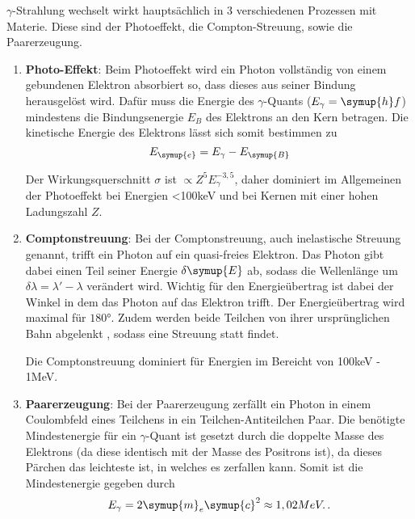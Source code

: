 \noindent
$\gamma$-Strahlung wechselt wirkt hauptsächlich in 3 verschiedenen Prozessen mit Materie. 
Diese sind der Photoeffekt, die Compton-Streuung, sowie die Paarerzeugung.
\begin{enumerate}
  \item \textbf{Photo-Effekt}:
  Beim Photoeffekt wird ein Photon vollständig von einem gebundenen Elektron absorbiert so, dass dieses aus seiner Bindung herausgelöst wird. 
  Dafür muss die Energie des $\gamma$-Quants ($E_\gamma = \symup{h}f$) mindestens die Bindungsenergie $E_B$ des Elektrons an den Kern betragen. Die
  kinetische Energie des Elektrons lässt sich somit bestimmen zu 
  \begin{equation}
    E_{\symup{e}} = E_\gamma - E_{\symup{B}}
    \label{eqn:1}
  \end{equation}

  \noindent
  Der Wirkungsquerschnitt $\sigma$ ist $\propto Z^5E_\gamma^{-3,5}$, daher dominiert im Allgemeinen 
  der Photoeffekt bei Energien <100keV und bei Kernen mit einer hohen Ladungszahl $Z$.

  \item \textbf{Comptonstreuung}:
  Bei der Comptonstreuung,  auch inelastische Streuung genannt, trifft ein Photon auf ein quasi-freies Elektron. 
  Das Photon gibt dabei einen Teil seiner Energie $\delta \symup{E}$
  ab, sodass die Wellenlänge um $\delta\lambda = \lambda' - \lambda $ verändert wird.
  Wichtig für den Energieübertrag ist dabei der Winkel in dem das Photon auf das Elektron trifft. Der 
  Energieübertrag wird maximal für $180°$. Zudem werden beide Teilchen von ihrer ursprünglichen Bahn abgelenkt
, sodass eine Streuung statt findet.

\noindent
Die Comptonstreuung dominiert für Energien im Bereicht von 100keV - 1MeV.


  \item \textbf{Paarerzeugung}:
  Bei der Paarerzeugung zerfällt ein Photon in einem Coulombfeld eines Teilchens in ein Teilchen-Antiteilchen Paar.
  Die benötigte Mindestenergie für ein $\gamma$-Quant ist gesetzt durch die doppelte Masse des Elektrons (da diese
  identisch mit der Masse des Positrons ist), da dieses Pärchen das leichteste ist, in welches es zerfallen kann.
  Somit ist die Mindestenergie gegeben durch 
  \begin{equation}
    E_\gamma =  2 \symup{m}_e \symup{c}^2 \approx 1, 02 MeV.\,  .
    \label{eqn:3}
  \end{equation}
\end{enumerate}


